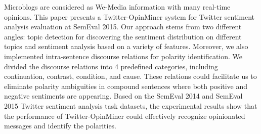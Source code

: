 Microblogs are considered as We-Media information with many real-time opinions. This paper presents a Twitter-OpinMiner system for Twitter sentiment analysis evaluation at SemEval 2015. Our approach stems from two different angles: topic detection for discovering the sentiment distribution on different topics and sentiment analysis based on a variety of features. Moreover, we also implemented intra-sentence discourse relations for polarity identification. We divided the discourse relations into 4 predefined categories, including continuation, contrast, condition, and cause. These relations could facilitate us to eliminate polarity ambiguities in compound sentences where both positive and negative sentiments are appearing. Based on the SemEval 2014 and SemEval 2015 Twitter sentiment analysis task datasets, the experimental results show that the performance of Twitter-OpinMiner could effectively recognize opinionated messages and identify the polarities.
